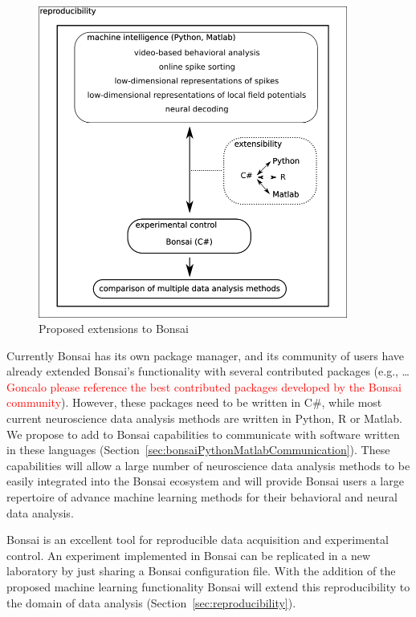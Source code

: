 \documentclass[a4paper,11point]{article}
\begin{document}
\begin{figure}
    \begin{center}
        \includegraphics[width=4in]{figures/proposed_bonsai_extensions.png}
        \caption{Proposed extensions to Bonsai}
        \label{fig:proposedBonsaiExtensions}
    \end{center}
\end{figure}

Currently Bonsai has its own package manager, and its community of users have
already extended Bonsai's functionality with several contributed packages
(e.g., \ldots \textcolor{red}{Goncalo please reference the best contributed
packages developed by the Bonsai community}). However, these packages need to
be written in C\#, while most current neuroscience data analysis methods are
written in Python, R or Matlab.  We propose to add to Bonsai capabilities to
communicate with software written in these languages
(Section~\ref{sec:bonsaiPythonMatlabCommunication}).  These capabilities will
allow a large number of neuroscience data analysis methods to be easily
integrated into the Bonsai ecosystem and will provide Bonsai users a large
repertoire of advance machine learning methods for their behavioral and neural
data analysis.

Bonsai is an excellent tool for reproducible data acquisition and
experimental control. An experiment implemented in Bonsai can be replicated in
a new laboratory by just sharing a Bonsai configuration file. With the addition
of the proposed machine learning functionality Bonsai will extend this
reproducibility to the domain of data analysis
(Section~\ref{sec:reproducibility}).
\end{document}
